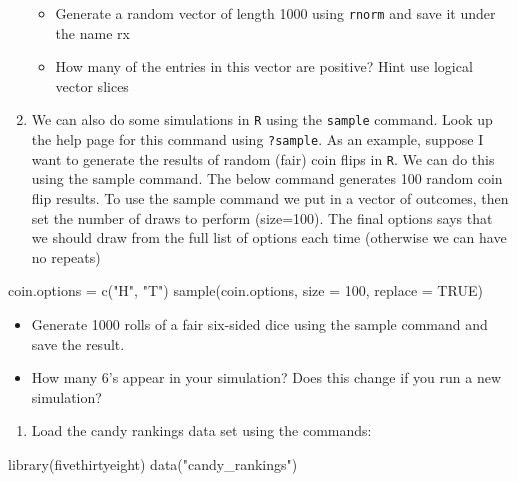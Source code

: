 \documentclass[
]{book}
\newenvironment{Shaded}{\begin{snugshade}}{\end{snugshade}}
\newcommand{\AttributeTok}[1]{\textcolor[rgb]{0.77,0.63,0.00}{#1}}
\newcommand{\ConstantTok}[1]{\textcolor[rgb]{0.00,0.00,0.00}{#1}}
\newcommand{\DecValTok}[1]{\textcolor[rgb]{0.00,0.00,0.81}{#1}}
\newcommand{\FunctionTok}[1]{\textcolor[rgb]{0.00,0.00,0.00}{#1}}
\newcommand{\NormalTok}[1]{#1}
\newcommand{\OtherTok}[1]{\textcolor[rgb]{0.56,0.35,0.01}{#1}}
\newcommand{\StringTok}[1]{\textcolor[rgb]{0.31,0.60,0.02}{#1}}
\providecommand{\tightlist}{%
  \setlength{\itemsep}{0pt}\setlength{\parskip}{0pt}}
\theoremstyle{definition}
\theoremstyle{definition}
\theoremstyle{definition}
\theoremstyle{definition}
\theoremstyle{remark}
\begin{document}
\begin{enumerate}
  \begin{itemize}
  \tightlist
  \item
    Generate a random vector of length 1000 using \texttt{rnorm} and save it under the name rx
  \item
    How many of the entries in this vector are positive? Hint use logical vector slices
  \end{itemize}
\item
  We can also do some simulations in \texttt{R} using the \texttt{sample} command. Look up the help page for this command using \texttt{?sample}. As an example, suppose I want to generate the results of random (fair) coin flips in \texttt{R}. We can do this
  using the sample command. The below command generates 100 random coin flip results. To use the sample command we put in a vector of outcomes, then set the number of draws to perform (size=100). The final options says that we should draw from the full list of options each time (otherwise we can have no repeats)
\end{enumerate}

\begin{Shaded}
\begin{Highlighting}[]
\NormalTok{coin.options }\OtherTok{=} \FunctionTok{c}\NormalTok{(}\StringTok{"H"}\NormalTok{, }\StringTok{"T"}\NormalTok{)}
\FunctionTok{sample}\NormalTok{(coin.options, }\AttributeTok{size =} \DecValTok{100}\NormalTok{, }\AttributeTok{replace =} \ConstantTok{TRUE}\NormalTok{)}
\end{Highlighting}
\end{Shaded}

\begin{itemize}
\tightlist
\item
  Generate 1000 rolls of a fair six-sided dice using the sample command and save the result.
\item
  How many 6's appear in your simulation? Does this change if you run a new simulation?
\end{itemize}

\begin{enumerate}
\def\labelenumi{\arabic{enumi}.}
\setcounter{enumi}{5}
\tightlist
\item
  Load the candy rankings data set using the commands:
\end{enumerate}

\begin{Shaded}
\begin{Highlighting}[]
\FunctionTok{library}\NormalTok{(fivethirtyeight)}
\FunctionTok{data}\NormalTok{(}\StringTok{"candy\_rankings"}\NormalTok{)}
\end{Highlighting}
\end{Shaded}
\end{document}
